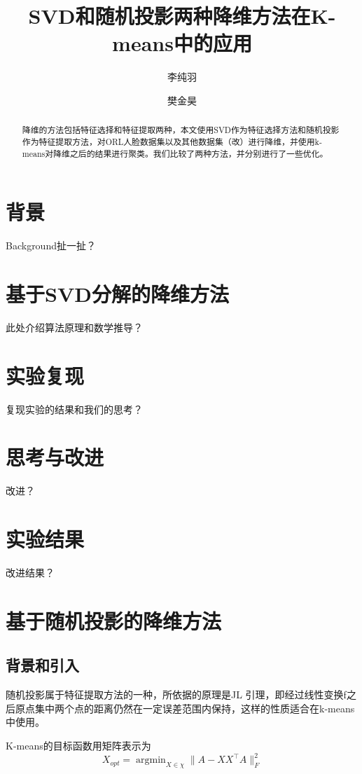 \documentclass{ctexart}
\title{SVD和随机投影两种降维方法在K-means中的应用}
\author{李纯羽 \and 樊金昊}
\begin{document}
    \maketitle

    \begin{abstract}
        降维的方法包括特征选择和特征提取两种，本文使用SVD作为特征选择方法和随机投影作为特征提取方法，对ORL人脸数据集以及其他数据集（改）进行降维，并使用k-means对降维之后的结果进行聚类。我们比较了两种方法，并分别进行了一些优化。
    \end{abstract}
    \tableofcontents
    \newpage

    \section{背景}
    Background扯一扯？

    \section{基于SVD分解的降维方法}
    此处介绍算法原理和数学推导？

    \section{实验复现}
    复现实验的结果和我们的思考？

    \section{思考与改进}
    改进？

    \section{实验结果}
    改进结果？
    
    \section{基于随机投影的降维方法}
    

    \subsection{背景和引入}
        随机投影属于特征提取方法的一种，所依据的原理是JL 引理，即经过线性变换f之后原点集中两个点的距离仍然在一定误差范围内保持，这样的性质适合在k-means中使用。

        K-means的目标函数用矩阵表示为
        \begin{equation*}
            X_{opt} = \mathop{\arg\min}_{X \in \chi} \| A - XX^{\top}A \|_{F}^2 \label{opt}
        \end{equation*}
\end{document}
